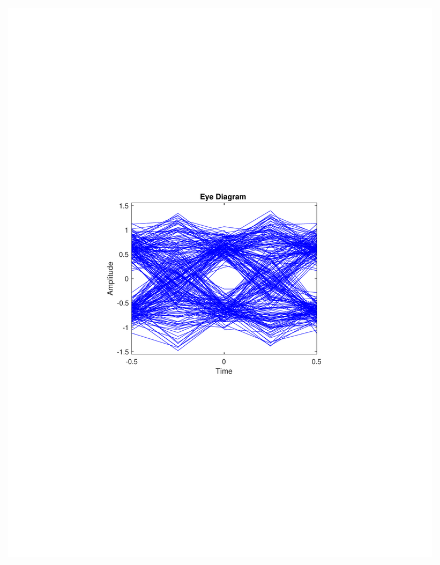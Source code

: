 \begin{refsection}
\begin{figure}[H]
\begin{minipage}{0.30\textwidth}
		\includegraphics[clip, trim=4cm 8cm 4cm 8cm, width=1\textwidth]{./sdf/m_qam_system/figures/expResults/homodyne/6_eye_4GBdInSig13dBc_AfMIMO2.pdf}
		\label{fig:4GBdSpecMIMO2}
	\end{minipage}
	\begin{minipage}{0.30\textwidth}
		\centering

\end{minipage}
\end{figure}
\end{refsection}

